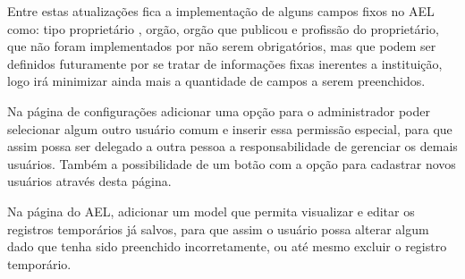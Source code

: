 Entre estas atualizações fica a implementação de alguns campos fixos no AEL como: tipo proprietário , orgão, orgão que publicou e profissão do proprietário, que não foram implementados por não serem obrigatórios, mas que podem ser definidos futuramente por se tratar de informações fixas inerentes a instituição, logo irá minimizar ainda mais a quantidade de campos a serem preenchidos.

Na página de configurações adicionar uma opção para o administrador poder selecionar algum outro usuário comum e inserir essa permissão especial, para que assim possa ser delegado a outra pessoa a responsabilidade de gerenciar os demais usuários. Também a possibilidade de um botão com a opção para cadastrar novos usuários através desta página.

Na página do AEL, adicionar um model que permita visualizar e editar os registros temporários já salvos, para que assim o usuário possa alterar algum dado que tenha sido preenchido incorretamente, ou até mesmo excluir o registro temporário.



